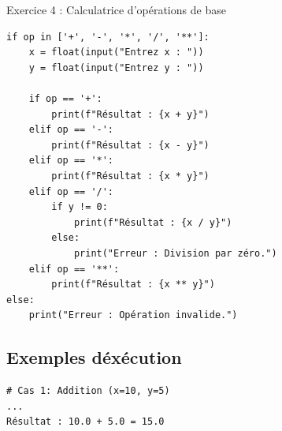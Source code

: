 \documentclass[10pt,a4paper]{article}
\begin{document}
\begin{exoBox}{Exercice 4 : Calculatrice d'opérations de base}
\begin{minipage}{\linewidth}
\begin{lstlisting}
if op in ['+', '-', '*', '/', '**']:
    x = float(input("Entrez x : "))
    y = float(input("Entrez y : "))

    if op == '+':
        print(f"Résultat : {x + y}")
    elif op == '-':
        print(f"Résultat : {x - y}")
    elif op == '*':
        print(f"Résultat : {x * y}")
    elif op == '/':
        if y != 0:
            print(f"Résultat : {x / y}")
        else:
            print("Erreur : Division par zéro.")
    elif op == '**':
        print(f"Résultat : {x ** y}")
else:
    print("Erreur : Opération invalide.")
\end{lstlisting}
\end{minipage}

\subsection*{Exemples d\'exécution}
\begin{verbatim}
# Cas 1: Addition (x=10, y=5)
...
Résultat : 10.0 + 5.0 = 15.0
\end{verbatim}
\end{exoBox}
\end{document}
